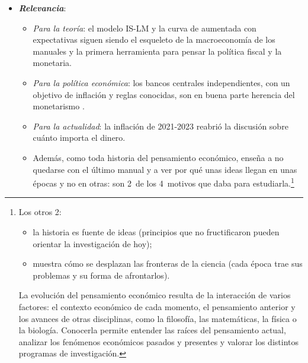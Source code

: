 \documentclass[11pt]{article}
\begin{document}
\begin{itemize}
\item \textbf{\emph{Relevancia}}:
  \begin{itemize}
  \item \emph{Para la teoría}: el modelo IS-LM y la curva de  aumentada con expectativas siguen siendo el esqueleto de la macroeconomía de los manuales y la primera herramienta para pensar la política fiscal y la monetaria\nocite{DeVroeyHoover2004Introduction}.
  \item \emph{Para la política económica}: los bancos centrales independientes, con un objetivo de inflación y reglas conocidas, son en buena parte herencia del monetarismo .
  \item \emph{Para la actualidad}: la inflación de 2021-2023 reabrió la discusión sobre cuánto importa el dinero\nocite{BLS2026IPC}.
  \item Además, como toda historia del pensamiento económico, enseña a no quedarse con el último manual y a ver por qué unas ideas llegan en unas épocas y no en otras: son 2~de los 4~motivos que daba  para estudiarla\nocite{Schumpeter1954History}.\footnote{Los otros 2:
\begin{itemize}
\item la historia es fuente de ideas (principios que no fructificaron pueden orientar la investigación de hoy);
\item muestra cómo se desplazan las fronteras de la ciencia (cada época trae sus problemas y su forma de afrontarlos).
\end{itemize}
La evolución del pensamiento económico resulta de la interacción de varios factores: el contexto económico de cada momento, el pensamiento anterior y los avances de otras disciplinas, como la filosofía, las matemáticas, la física o la biología. Conocerla permite entender las raíces del pensamiento actual, analizar los fenómenos económicos pasados y presentes y valorar los distintos programas de investigación.}
  \end{itemize}


\end{itemize}
\end{document}
